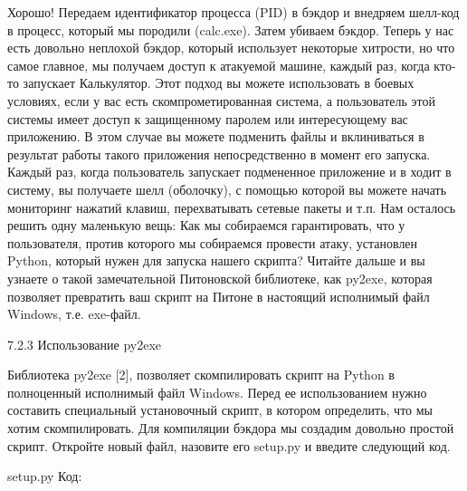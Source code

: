 \documentclass[12pt, a4paper, oneside]{book}
\begin{document}
Хорошо! Передаем идентификатор процесса (PID) в бэкдор и внедряем шелл-код в процесс, который мы породили (calc.exe). Затем убиваем бэкдор. Теперь у нас есть довольно неплохой бэкдор, который использует некоторые хитрости, но что самое главное, мы получаем доступ к атакуемой машине, каждый раз, когда кто-то запускает Калькулятор. Этот подход вы можете использовать в боевых условиях, если у вас есть скомпрометированная система, а пользователь этой системы имеет доступ к защищенному паролем или интересующему вас приложению. В этом случае вы можете подменить файлы и вклиниваться в результат работы такого приложения непосредственно в момент его запуска. Каждый раз, когда пользователь запускает подмененное приложение и в ходит в систему, вы получаете шелл (оболочку), с помощью которой вы можете начать мониторинг нажатий клавиш, перехватывать сетевые пакеты и т.п. Нам осталось решить одну маленькую вещь: Как мы собираемся гарантировать, что у пользователя, против которого мы собираемся провести атаку, установлен Python, который нужен для запуска нашего скрипта? Читайте дальше и вы узнаете о такой замечательной Питоновской библиотеке, как py2exe, которая позволяет превратить ваш скрипт на Питоне в настоящий исполнимый файл Windows, т.е. exe-файл. 

7.2.3 Использование py2exe

Библиотека py2exe [2], позволяет скомпилировать скрипт на Python в полноценный исполнимый файл Windows. Перед ее использованием нужно составить специальный установочный скрипт, в котором определить, что мы хотим скомпилировать. Для компиляции бэкдора мы создадим довольно простой скрипт. Откройте новый файл, назовите его setup.py и введите следующий код.

setup.py
Код:
\end{document}
